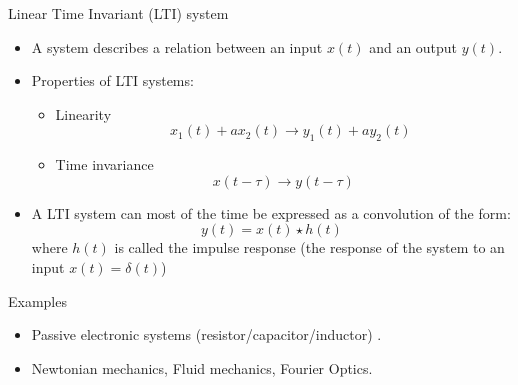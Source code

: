 \begin{block}{Linear Time Invariant (LTI) system}\vspace{-1mm} 
  \begin{itemize}
  \item A system describes a relation between an input $x(t)$ and an output $y(t)$.
  \item Properties of LTI systems:\vspace{-1mm}
    \begin{itemize}
    \item Linearity \vspace{-3mm}
      $$\quad x_1(t)+ax_2(t)\rightarrow y_1(t)+ay_2(t)$$
    \item Time invariance\vspace{-3mm}
$$x(t-\tau)\rightarrow y(t-\tau)$$
    \end{itemize}
    \item A LTI system can most of the time be expressed as a convolution of the form:
    $$y(t)=x(t)\star h(t)$$
    where $h(t)$ is called the impulse response (the response of the system to an input $x(t)=\delta(t)$)
  \end{itemize}
\end{block}


\begin{exampleblock}{Examples}
\begin{itemize}
\item Passive electronic systems (resistor/capacitor/inductor) .
\item Newtonian mechanics, Fluid mechanics, Fourier Optics.
\end{itemize}
\end{exampleblock}



